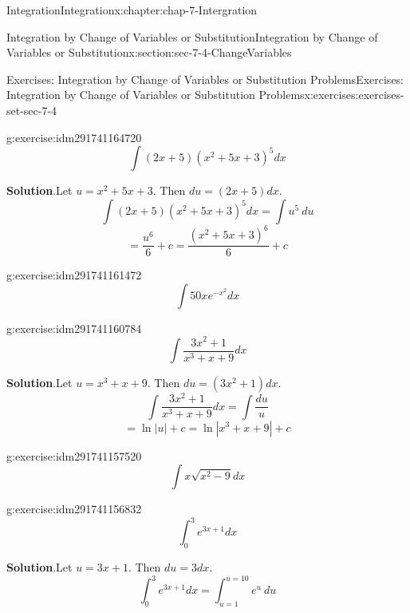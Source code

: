 \documentclass[oneside,10pt,]{book}
\numberwithin{equation}{section}
\begin{document}
\begin{chapterptx}{Integration}{}{Integration}{}{}{x:chapter:chap-7-Intergration}
\begin{sectionptx}{Integration by Change of Variables or Substitution}{}{Integration by Change of Variables or Substitution}{}{}{x:section:sec-7-4-ChangeVariables}
\begin{exercises-subsection}{Exercises: Integration by Change of Variables or Substitution Problems}{}{Exercises: Integration by Change of Variables or Substitution Problems}{}{}{x:exercises:exercises-set-sec-7-4}
\begin{divisionexercise}{9}{}{}{g:exercise:idm291741164720}
%
\begin{equation*}
\int (2x+5) (x^2+5x+3)^5  dx 
\end{equation*}
\par\smallskip%
\noindent\textbf{Solution}.\hypertarget{g:solution:idm291741164032}{}\quad{}Let \(u=x^2+5x+3\).  Then \(du=(2x+5)dx\).%
%
\begin{equation*}
\int (2x+5) (x^2+5x+3)^5  dx=\int u^5\ du
\end{equation*}
%
\begin{equation*}
=\frac{u^6}{6} +c
=\frac{(x^2+5x+3)^6}{6} +c
\end{equation*}
\end{divisionexercise}%
\begin{divisionexercise}{10}{}{}{g:exercise:idm291741161472}%
%
\begin{equation*}
\int 50xe^{-x^2 }  dx
\end{equation*}
\end{divisionexercise}%
\begin{divisionexercise}{11}{}{}{g:exercise:idm291741160784}%
%
\begin{equation*}
\int \frac{3x^2+1}{x^3+x+9} dx 
\end{equation*}
\par\smallskip%
\noindent\textbf{Solution}.\hypertarget{g:solution:idm291741160080}{}\quad{}Let \(u=x^3+x+9\).  Then \(du=(3x^2+1)dx\).%
%
\begin{equation*}
\int \frac{3x^2+1}{x^3+x+9} dx=\int \frac{du}{u}
\end{equation*}
%
\begin{equation*}
=\ln|u| +c
=\ln|x^3+x+9| +c
\end{equation*}
\end{divisionexercise}%
\begin{divisionexercise}{12}{}{}{g:exercise:idm291741157520}%
%
\begin{equation*}
\int x\sqrt{x^2-9}  dx
\end{equation*}
\end{divisionexercise}%
\begin{divisionexercise}{13}{}{}{g:exercise:idm291741156832}%
%
\begin{equation*}
\int_0^3 e^{3x+1} dx
\end{equation*}
\par\smallskip%
\noindent\textbf{Solution}.\hypertarget{g:solution:idm291741156144}{}\quad{}Let \(u=3x+1\).  Then \(du=3dx\).%
%
\begin{equation*}
\int_0^3 e^{3x+1} dx=\int_{u=1}^{u=10} e^u \ du

\end{equation*}
\end{divisionexercise}
\end{exercises-subsection}
\end{sectionptx}
\end{chapterptx}
\end{document}
